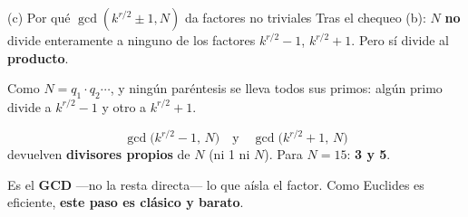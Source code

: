 \documentclass[aspectratio=169]{beamer}
\begin{document}
\begin{frame}{(c) Por qué $\gcd(k^{r/2}\pm1,N)$ da factores no triviales}
  Tras el chequeo (b): $N$ \textbf{no} divide enteramente a ninguno de los
  factores $k^{r/2}-1$, $k^{r/2}+1$. Pero sí divide al \textbf{producto}.

  Como $N=q_1\cdot q_2\cdots$, y ningún paréntesis se lleva todos sus primos:
  algún primo divide a $k^{r/2}-1$ y otro a $k^{r/2}+1$.

  \[
    \gcd\!\bigl(k^{r/2}-1,\,N\bigr)
    \quad\text{y}\quad
    \gcd\!\bigl(k^{r/2}+1,\,N\bigr)
  \]
  devuelven \textbf{divisores propios} de $N$ (ni 1 ni $N$).
  Para $N=15$: \textbf{3 y 5}.

  \begin{block}{}
    \small Es el \textbf{GCD} —no la resta directa— lo que aísla el factor.
    Como Euclides es eficiente, \textbf{este paso es clásico y barato}.
  \end{block}

\end{frame}
\end{document}
